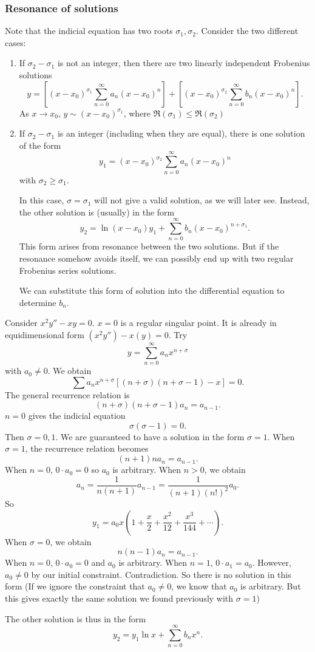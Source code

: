 \documentclass[a4paper]{article}
\begin{document}
\subsubsection*{Resonance of solutions}
Note that the indicial equation has two roots $\sigma_1, \sigma_2$. Consider the two different cases:
\begin{enumerate}
  \item If $\sigma_2 - \sigma_1$ is not an integer, then there are two linearly independent Frobenius solutions
    \[
      y = \left[(x - x_0)^{\sigma_1}\sum_{n = 0}^{\infty} a_n(x - x_0)^n\right] + \left[(x - x_0)^{\sigma_2}\sum_{n = 0}^{\infty} b_n(x - x_0)^n\right].
    \]
    As $x\to x_0$, $y \sim (x - x_0)^{\sigma_1}$, where $\Re(\sigma_1) \leq \Re(\sigma_2)$

  \item If $\sigma_2 - \sigma_1$ is an integer (including when they are equal), there is one solution of the form
    \[
      y_1 = (x - x_0)^{\sigma_2}\sum_{n = 0}^{\infty} a_n(x - x_0)^n
    \]
    with $\sigma_2 \geq \sigma_1$.

    In this case, $\sigma = \sigma_1$ will not give a valid solution, as we will later see. Instead, the other solution is (usually) in the form
    \[
      y_2 = \ln(x - x_0)y_1 + \sum_{n = 0}^\infty b_n(x - x_0)^{n + \sigma_1}.
    \]
    This form arises from resonance between the two solutions. But if the resonance somehow avoids itself, we can possibly end up with two regular Frobenius series solutions.

    We can substitute this form of solution into the differential equation to determine $b_n$.
\end{enumerate}
\begin{eg}
  Consider $x^2 y'' - xy = 0$. $x = 0$ is a regular singular point. It is already in equidimensional form $(x^2y'') - x(y) = 0$. Try
  \[
    y = \sum_{n = 0}^\infty a_n x^{n + \sigma}
  \]
  with $a_0 \not= 0$. We obtain
  \[
    \sum a_nx^{n + \sigma}[(n + \sigma)(n + \sigma - 1) - x] = 0.
  \]
  The general recurrence relation is
  \[
    (n + \sigma)(n + \sigma - 1)a_n = a_{n - 1}.
  \]
  $n = 0$ gives the indicial equation
  \[
    \sigma(\sigma - 1) = 0.
  \]
  Then $\sigma = 0, 1$. We are guaranteed to have a solution in the form $\sigma = 1$. When $\sigma = 1$, the recurrence relation becomes
  \[
    (n + 1)n a_n = a_{n - 1}.
  \]
  When $n = 0$, $0\cdot a_0 = 0$ so $a_0$ is arbitrary.
  When $n > 0$, we obtain
  \[
    a_n = \frac{1}{n(n +1)}a_{n - 1} = \frac{1}{(n + 1)(n!)^2}a_0.
  \]
  So
  \[
    y_1 = a_0x\left(1 + \frac{x}{2} + \frac{x^2}{12} + \frac{x^3}{144} + \cdots \right).
  \]
  When $\sigma = 0$, we obtain
  \[
    n(n - 1)a_n = a_{n - 1}.
  \]
  When $n = 0$, $0\cdot a_0 = 0$ and $a_0$ is arbitrary. When $n = 1$, $0\cdot a_1 = a_0$. However, $a_0\not= 0$ by our initial constraint. Contradiction. So there is no solution in this form (If we ignore the constraint that $a_0\not= 0$, we know that $a_0$ is arbitrary. But this gives exactly the same solution we found previously with $\sigma = 1$)

  The other solution is thus in the form
  \[
    y_2 = y_1\ln x + \sum_{n = 0}^\infty b_nx^n.
  \]
\end{eg}
\end{document}
